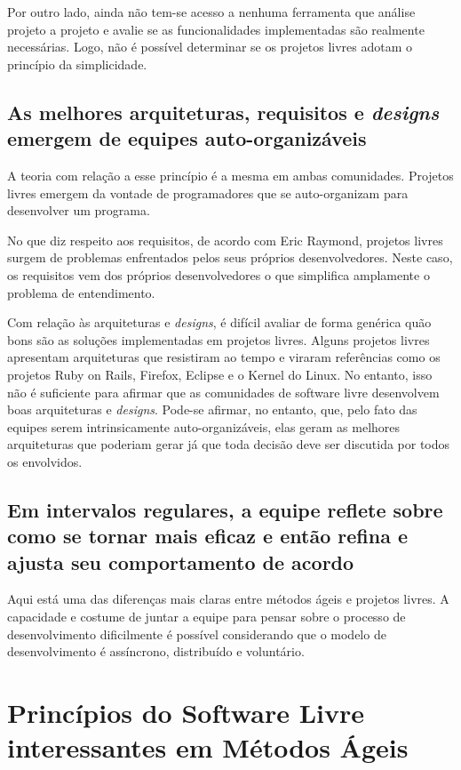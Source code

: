Por outro lado, ainda não tem-se acesso a nenhuma ferramenta que
análise projeto a projeto e avalie se as funcionalidades
implementadas são realmente necessárias. Logo, não é possível
determinar se os projetos livres adotam o princípio da simplicidade.

\subsection[Equipes auto-organizáveis]{As melhores arquiteturas,
  requisitos e \textit{designs} emergem de equipes auto-organizáveis}

A teoria com relação a esse princípio é a mesma em ambas
comunidades. Projetos livres emergem da vontade de programadores que
se auto-organizam para desenvolver um programa.

No que diz respeito aos requisitos, de acordo com Eric Raymond,
projetos livres surgem de problemas enfrentados pelos seus próprios
desenvolvedores. Neste caso, os requisitos vem dos próprios
desenvolvedores o que simplifica amplamente o problema de
entendimento.

Com relação às arquiteturas e \textit{designs}, é difícil avaliar de
forma genérica quão bons são as soluções implementadas em projetos
livres. Alguns projetos livres apresentam arquiteturas que resistiram
ao tempo e viraram referências como os projetos Ruby on Rails,
Firefox, Eclipse e o Kernel do Linux. No entanto, isso não é
suficiente para afirmar que as comunidades de software livre
desenvolvem boas arquiteturas e \textit{designs}. Pode-se afirmar, no
entanto, que, pelo fato das equipes serem intrinsicamente
auto-organizáveis, elas geram as melhores arquiteturas que poderiam
gerar já que toda decisão deve ser discutida por todos os envolvidos.

\subsection[Refletir regularmente]{Em intervalos regulares, a equipe
  reflete sobre como se tornar mais eficaz e então refina e ajusta seu
  comportamento de acordo}

Aqui está uma das diferenças mais claras entre métodos ágeis e
projetos livres. A capacidade e costume de juntar a equipe para pensar
sobre o processo de desenvolvimento dificilmente é possível
considerando que o modelo de desenvolvimento é assíncrono, distribuído
e voluntário.

\section{Princípios do Software Livre interessantes em Métodos Ágeis}
\label{sec:foss-over-agile}

